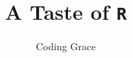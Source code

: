 \documentclass[a4paper,12pt]{article}
\begin{document}
\usepackage{fancyhdr} %
\pagestyle{fancy} %
\renewcommand{\headrulewidth}{0pt} %
\lhead{}\chead{}\rhead{}
\lfoot{}\cfoot{\thepage}\rfoot{}

\usepackage{sectsty}
\allsectionsfont{\sffamily\mdseries\upshape} %

\usepackage[nottoc,notlof,notlot]{tocbibind} %
\usepackage[titles,subfigure]{tocloft} %
\usepackage{framed}
\renewcommand{\cftsecfont}{\rmfamily\mdseries\upshape}
\renewcommand{\cftsecpagefont}{\rmfamily\mdseries\upshape} %



\title{ A Taste of \texttt{R}}
\author{Coding Grace}
\end{document}
